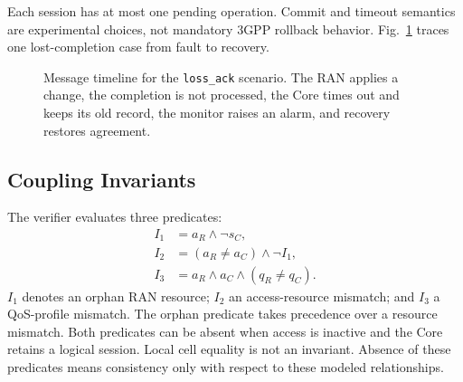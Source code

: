 \documentclass[conference]{IEEEtran}
\begin{document}
Each session has at most one pending operation. Commit and timeout semantics are experimental choices, not mandatory 3GPP rollback behavior. Fig.~\ref{fig:timeline} traces one lost-completion case from fault to recovery.

\begin{figure}[t]
\centering
{}
\caption{Message timeline for the \texttt{loss\_ack} scenario. The RAN applies a change, the completion is not processed, the Core times out and keeps its old record, the monitor raises an alarm, and recovery restores agreement.}
\label{fig:timeline}
\end{figure}

\subsection{Coupling Invariants}
The verifier evaluates three predicates:
\begin{align}
I_1 &= a_R \land \neg s_C,\\
I_2 &= (a_R \ne a_C) \land \neg I_1,\\
I_3 &= a_R \land a_C \land (q_R \ne q_C).
\end{align}
$I_1$ denotes an orphan RAN resource; $I_2$ an access-resource mismatch; and $I_3$ a QoS-profile mismatch. The orphan predicate takes precedence over a resource mismatch. Both predicates can be absent when access is inactive and the Core retains a logical session. Local cell equality is not an invariant. Absence of these predicates means consistency only with respect to these modeled relationships.
\end{document}
